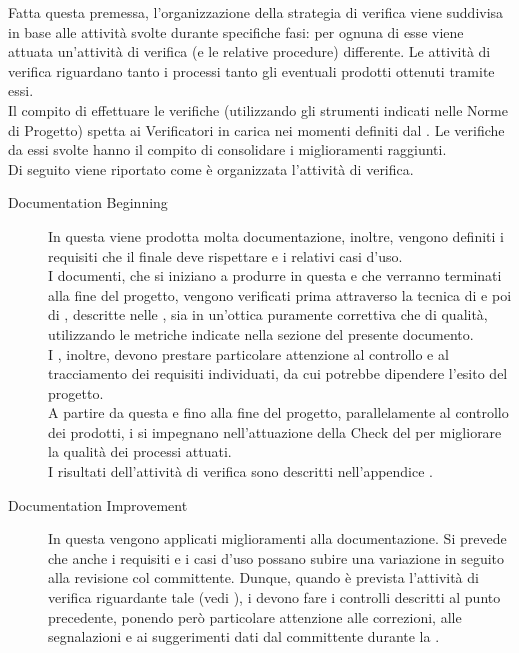 		Fatta questa premessa, l'organizzazione della strategia di verifica viene suddivisa in base alle attività svolte durante specifiche fasi: per ognuna di esse viene attuata un'attività di verifica (e le relative procedure) differente. Le attività di verifica riguardano tanto i processi tanto gli eventuali prodotti ottenuti tramite essi.\\
		Il compito di effettuare le verifiche (utilizzando gli strumenti indicati nelle Norme di Progetto) spetta ai Verificatori in carica nei momenti definiti dal . Le verifiche da essi svolte hanno il compito di consolidare i miglioramenti raggiunti.\\
		Di seguito viene riportato come è organizzata l'attività di verifica.
		\begin{description}
			\item[ Documentation Beginning] In questa  viene prodotta molta documentazione, inoltre, vengono definiti i requisiti che il  finale deve rispettare e i relativi casi d'uso. \\
			I documenti, che si iniziano a produrre in questa  e che verranno terminati alla fine del progetto, vengono verificati prima attraverso la tecnica di  e poi di , descritte nelle , sia in un'ottica puramente correttiva che di qualità, utilizzando le metriche indicate nella sezione  del presente documento. \\
			I , inoltre, devono prestare particolare attenzione al controllo e al tracciamento dei requisiti individuati, da cui potrebbe dipendere l'esito del progetto.\\
			A partire da questa  e fino alla fine del progetto, parallelamente al controllo dei prodotti, i  si impegnano nell'attuazione della  Check del  per migliorare la qualità dei processi attuati. \\
			I risultati dell'attività di verifica sono descritti nell'appendice .
			\item[ Documentation Improvement] In questa  vengono applicati miglioramenti alla documentazione. Si prevede che anche i requisiti e i casi d'uso 
			possano subire una variazione in seguito alla revisione col committente. Dunque, quando è prevista l'attività di verifica riguardante tale  (vedi ), i  devono fare i controlli descritti al punto precedente, ponendo però particolare attenzione alle correzioni, alle segnalazioni e ai suggerimenti dati dal committente durante la .\\

\end{description}
